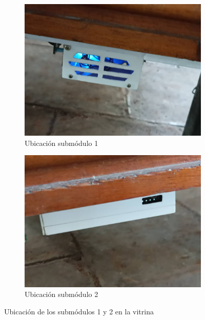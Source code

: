     \begin{figure}[H]
        \centering
        \begin{subfigure}[b]{0.45\linewidth}
        \includegraphics[width=\linewidth]{imagenes/submodulo 1.jpg}
        \caption{Ubicación submódulo 1}
        \label{imag:ubicacion_submodulo1}
    \end{subfigure}
    \begin{subfigure}[b]{0.45\linewidth}
        \includegraphics[width=\linewidth]{imagenes/submodulo 2.jpg}
        \caption{Ubicación submódulo 2}
        \label{imag:ubicacion_submodulo2}
    \end{subfigure}
        \caption{Ubicación de los submódulos 1 y 2 en la vitrina}
        \label{imag:ubicacion_submodulos1y2_vitrina}
    \end{figure}

